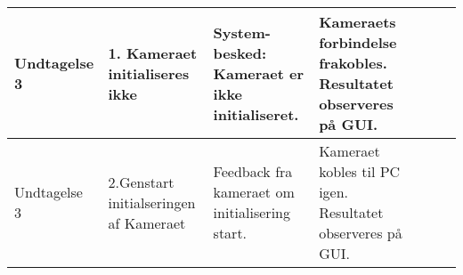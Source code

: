 \begin{center}
\begin{longtable}{ | m{1.785cm} | m{1.785cm}| m{1.785cm}| m{1.785cm}| m{1.785cm}| m{1.785cm}|m{1.785cm}| }
		Undtagelse 3 & 1. Kameraet initialiseres ikke & System-besked: Kameraet er ikke initialiseret. & Kameraets forbindelse frakobles. Resultatet observeres på GUI.  &  & & \\
			\hline
		
		Undtagelse 3 & 2.Genstart initialseringen af Kameraet & Feedback fra kameraet om initialisering start. & Kameraet kobles til PC igen. Resultatet observeres på GUI.  &  & & \\
			\hline
			
		\end{longtable}
		
	\end{center}
	\pagebreak